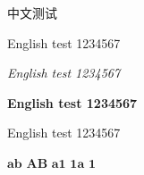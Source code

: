 \documentclass{exam-zh}
\begin{document}
中文测试

{English test 1234567}

{\itshape English test 1234567}

{\bfseries English test 1234567}

{\sffamily English test 1234567}


$\boldsymbol{ab}$
$\boldsymbol{AB}$
$\boldsymbol{a1}$
$\boldsymbol{1a}$
$\boldsymbol{1}$
\end{document}
